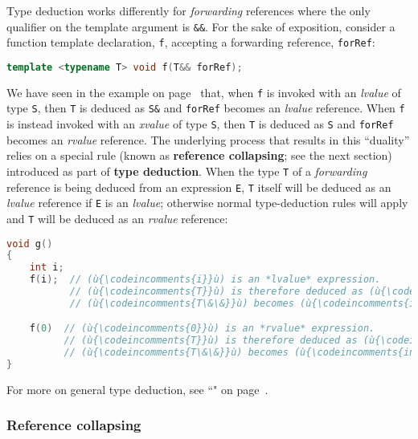 \noindent Type deduction works differently for \emph{forwarding} references
where the only qualifier on the template argument is \texttt{\&\&}. For
the sake of exposition, consider a function template declaration,
\texttt{f}, accepting a forwarding reference, \texttt{forRef}:

\begin{lstlisting}[language=C++]
template <typename T> void f(T&& forRef);
\end{lstlisting}

\noindent We have seen in the example on page~\pageref{f-invoked-example} that,
when \texttt{f} is invoked with an
\emph{lvalue} of type \texttt{S}, then \texttt{T} is deduced as
\texttt{S\&} and \texttt{forRef} becomes an \emph{lvalue} reference.
When \texttt{f} is instead invoked with an \emph{xvalue} of type
\texttt{S}, then \texttt{T} is deduced as \texttt{S} and
\texttt{forRef} becomes an \emph{rvalue} reference. The underlying
process that results in this ``duality'' relies on a special rule (known
as \textbf{reference collapsing}; see the next section) introduced as part of
\textbf{type deduction}. When the type \texttt{T} of a
\emph{forwarding} reference is being deduced from an expression
\texttt{E}, \texttt{T} itself will be deduced as an \emph{lvalue}
reference if \texttt{E} is an \emph{lvalue}; otherwise normal
type-deduction rules will apply and \texttt{T} will be deduced as an \emph{rvalue}
reference:

\begin{lstlisting}[language=C++]
void g()
{
    int i;
    f(i);  // (ù{\codeincomments{i}}ù) is an *lvalue* expression.
           // (ù{\codeincomments{T}}ù) is therefore deduced as (ù{\codeincomments{int\&}}ù) -- special rule!
           // (ù{\codeincomments{T\&\&}}ù) becomes (ù{\codeincomments{int\& \&\&}}ù), which collapses to (ù{\codeincomments{int\&}}ù).

    f(0)  // (ù{\codeincomments{0}}ù) is an *rvalue* expression.
          // (ù{\codeincomments{T}}ù) is therefore deduced as (ù{\codeincomments{int}}ù).
          // (ù{\codeincomments{T\&\&}}ù) becomes (ù{\codeincomments{int\&\&}}ù), which is an *rvalue* reference.
}
\end{lstlisting}

\noindent For more on general type deduction, see ``" on page~\pageref{auto-feature}.

\subsubsection[Reference collapsing]{Reference collapsing}\label{reference-collapsing}


